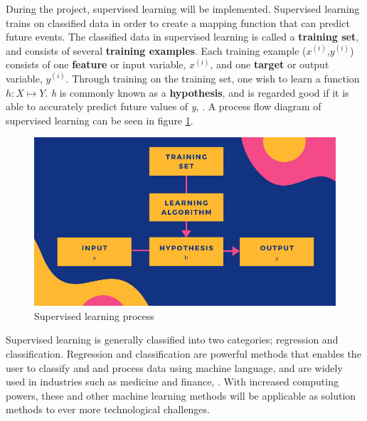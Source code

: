 During the project, supervised learning will be implemented. Supervised learning trains on classified data in order to create a mapping function that can predict future events. The classified data in supervised learning is called a \textbf{training set}, and consists of several \textbf{training examples}. Each training example ($x^{(i)}$,$y^{(i)}$) consists of one \textbf{feature} or input variable, \emph{$x^{(i)}$}, and one \textbf{target} or output variable, \emph{$y^{(i)}$}. Through training on the training set, one wish to learn a function $h : X \mapsto Y$. \emph{h} is commonly known as a \textbf{hypothesis}, and is regarded good if it is able to accurately predict future values of \emph{y}, \citep{Supervised}. A process flow diagram of supervised learning can be seen in figure \ref{fig:supervised}.

\begin{figure}[h!]
\centering
\includegraphics[scale=0.5]{Images/1_introduction/SUPERVISED LEARNING.png}
\caption{Supervised learning process}
\label{fig:supervised}
\end{figure}

Supervised learning is generally classified into two categories; regression and classification. Regression and classification are powerful methods that enables the user to classify and and process data using machine language, and are widely used in industries  such as medicine and finance, \citep{SupMet}. With increased computing powers, these and other machine learning methods will be applicable as solution methods to ever more technological challenges.  

